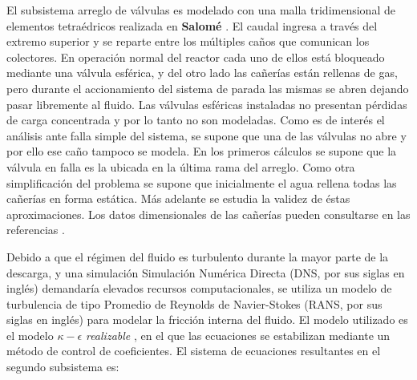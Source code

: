 El subsistema arreglo de válvulas es modelado con una malla tridimensional de elementos tetraédricos realizada en \textbf{Salomé} \cite{salome}.
El caudal ingresa a través del extremo superior y se reparte entre los múltiples caños que comunican los colectores.
En operación normal del reactor cada uno de ellos está bloqueado mediante una válvula esférica,
y del otro lado las cañerías están rellenas de gas,
pero durante el accionamiento del sistema de parada las mismas se abren dejando pasar libremente al fluido.
Las válvulas esféricas instaladas no presentan pérdidas de carga concentrada y por lo tanto no son modeladas.
Como es de interés el análisis ante falla simple del sistema,
se supone que una de las válvulas no abre y por ello ese caño tampoco se modela.
En los primeros cálculos se supone que la válvula en falla es la ubicada en la última rama del arreglo.
Como otra simplificación del problema se supone que inicialmente el agua rellena todas las cañerías en forma estática.
Más adelante se estudia la validez de éstas aproximaciones.
Los datos dimensionales de las cañerías pueden consultarse en las referencias \cite{invap-mockup}.

Debido a que el régimen del fluido es turbulento durante la mayor parte de la descarga,
y una simulación Simulación Numérica Directa (DNS, por sus siglas en inglés) demandaría elevados recursos computacionales,
se utiliza un modelo de turbulencia de tipo Promedio de Reynolds de Navier-Stokes (RANS, por sus siglas en inglés)
para modelar la fricción interna del fluido.
El modelo utilizado es el modelo $\kappa-\epsilon$ \textit{realizable} \cite{k-e-realizable},
en el que las ecuaciones se estabilizan mediante un método de control de coeficientes.
El sistema de ecuaciones resultantes en el segundo subsistema es:

